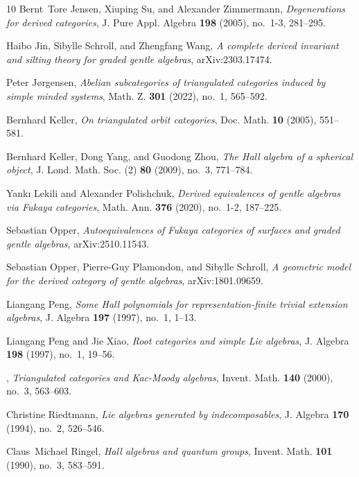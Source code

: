 \documentclass[reqno,12pt,a4paper]{amsart}
\theoremstyle{remark}
\theoremstyle{definition}
\numberwithin{equation}{section}
\begin{document}
\begin{thebibliography}{10}
Bernt~Tore Jensen, Xiuping Su, and Alexander Zimmermann, \emph{Degenerations
  for derived categories}, J. Pure Appl. Algebra \textbf{198} (2005), no.~1-3,
  281--295.

Haibo Jin, Sibylle Schroll, and Zhengfang Wang, \emph{A complete derived
  invariant and silting theory for graded gentle algebras}, arXiv:2303.17474.

Peter J{\o}rgensen, \emph{Abelian subcategories of triangulated categories
  induced by simple minded systems}, Math. Z. \textbf{301} (2022), no.~1,
  565--592. 

Bernhard Keller, \emph{{On triangulated orbit categories}}, Doc. Math.
  \textbf{10} (2005), 551--581.

Bernhard Keller, Dong Yang, and Guodong Zhou, \emph{The {H}all algebra of a
  spherical object}, J. Lond. Math. Soc. (2) \textbf{80} (2009), no.~3,
  771--784.

Yank\i{} Lekili and Alexander Polishchuk, \emph{Derived equivalences of gentle
  algebras via {F}ukaya categories}, Math. Ann. \textbf{376} (2020), no.~1-2,
  187--225.

Sebastian Opper, \emph{Autoequivalences of Fukaya categories of surfaces and
  graded gentle algebras}, arXiv:2510.11543.

Sebastian Opper, Pierre-Guy Plamondon, and Sibylle Schroll, \emph{A geometric
  model for the derived category of gentle algebras}, arXiv:1801.09659.

Liangang Peng, \emph{Some {H}all polynomials for representation-finite trivial
  extension algebras}, J. Algebra \textbf{197} (1997), no.~1, 1--13.

Liangang Peng and Jie Xiao, \emph{Root categories and simple {L}ie algebras},
  J. Algebra \textbf{198} (1997), no.~1, 19--56.

\bysame, \emph{Triangulated categories and {K}ac-{M}oody algebras}, Invent.
  Math. \textbf{140} (2000), no.~3, 563--603.

Christine Riedtmann, \emph{Lie algebras generated by indecomposables}, J.
  Algebra \textbf{170} (1994), no.~2, 526--546.

Claus~Michael Ringel, \emph{Hall algebras and quantum groups}, Invent. Math.
  \textbf{101} (1990), no.~3, 583--591.


\end{thebibliography}
\end{document}
